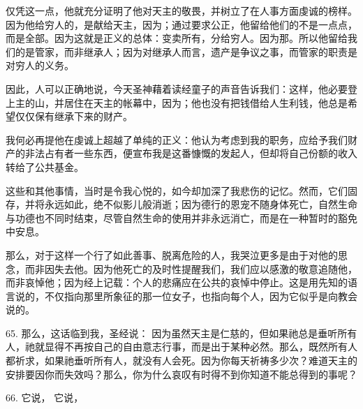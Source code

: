 仅凭这一点，他就充分证明了他对天主的敬畏，并树立了在人事方面虔诚的榜样。因为他给穷人的，是献给天主，因为；通过要求公正，他留给他们的不是一点点，而是全部。因为这就是正义的总体：变卖所有，分给穷人。因为那。所以他留给我们的是管家，而非继承人；因为对继承人而言，遗产是争议之事，而管家的职责是对穷人的义务。\par

因此，人可以正确地说，今天圣神藉着读经童子的声音告诉我们：这样，他必要登上主的山，并居住在天主的帐幕中，因为；他也没有把钱借给人生利钱，他总是希望仅仅保有继承下来的财产。\par

我何必再提他在虔诚上超越了单纯的正义：他认为考虑到我的职务，应给予我们财产的非法占有者一些东西，便宣布我是这番慷慨的发起人，但却将自己份额的收入转给了公共基金。\par

这些和其他事情，当时是令我心悦的，如今却加深了我悲伤的记忆。然而，它们固存，并将永远如此，绝不似影儿般消逝；因为德行的恩宠不随身体死亡，自然生命与功德也不同时结束，尽管自然生命的使用并非永远消亡，而是在一种暂时的豁免中安息。\par

那么，对于这样一个行了如此善事、脱离危险的人，我哭泣更多是由于对他的思念，而非因失去他。因为他死亡的及时性提醒我们，我们应以感激的敬意追随他，而非哀悼他；因为经上记载：个人的悲痛应在公共的哀悼中停止。这是用先知的语言说的，不仅指向那里所象征的那一位女子，也指向每个人，因为它似乎是向教会说的。\par

65. 那么，这话临到我，圣经说：  因为虽然天主是仁慈的，但如果祂总是垂听所有人，祂就显得不再按自己的自由意志行事，而是出于某种必然。那么，既然所有人都祈求，如果祂垂听所有人，就没有人会死。因为你每天祈祷多少次？难道天主的安排要因你而失效吗？那么，你为什么哀叹有时得不到你知道不能总得到的事呢？\par

66.  它说， 它说，\par

